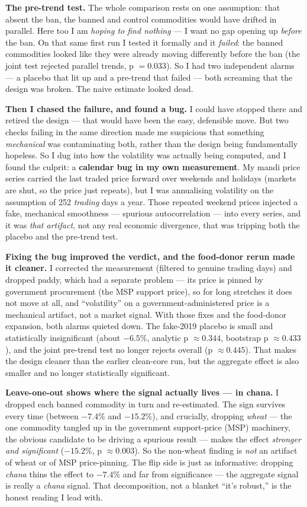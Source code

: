 \documentclass[11pt]{article}
\begin{document}
\textbf{The pre-trend test.} The whole comparison rests on one assumption: that absent the ban, the banned and control commodities would have drifted in parallel. Here too I am \emph{hoping to find nothing} --- I want no gap opening up \emph{before} the ban. On that same first run I tested it formally and it \emph{failed}: the banned commodities looked like they were already moving differently before the ban (the joint test rejected parallel trends, p $=0.033$). So I had two independent alarms --- a placebo that lit up and a pre-trend that failed --- both screaming that the design was broken. The naive estimate looked dead.

\textbf{Then I chased the failure, and found a bug.} I could have stopped there and retired the design --- that would have been the easy, defensible move. But two checks failing in the same direction made me suspicious that something \emph{mechanical} was contaminating both, rather than the design being fundamentally hopeless. So I dug into how the volatility was actually being computed, and I found the culprit: a \textbf{calendar bug in my own measurement}. My mandi price series carried the last traded price forward over weekends and holidays (markets are shut, so the price just repeats), but I was annualising volatility on the assumption of 252 \emph{trading} days a year. Those repeated weekend prices injected a fake, mechanical smoothness --- spurious autocorrelation --- into every series, and it was \emph{that artifact}, not any real economic divergence, that was tripping both the placebo and the pre-trend test.

\textbf{Fixing the bug improved the verdict, and the food-donor rerun made it cleaner.} I corrected the measurement (filtered to genuine trading days) and dropped paddy, which had a separate problem --- its price is pinned by government procurement (the MSP support price), so for long stretches it does not move at all, and ``volatility'' on a government-administered price is a mechanical artifact, not a market signal. With those fixes and the food-donor expansion, both alarms quieted down. The fake-2019 placebo is small and statistically insignificant (about $-6.5\%$, analytic p $\approx 0.344$, bootstrap p $\approx 0.433$), and the joint pre-trend test no longer rejects overall (p $\approx 0.445$). That makes the design cleaner than the earlier clean-core run, but the aggregate effect is also smaller and no longer statistically significant.

\textbf{Leave-one-out shows where the signal actually lives --- in chana.} I dropped each banned commodity in turn and re-estimated. The sign survives every time (between $-7.4\%$ and $-15.2\%$), and crucially, dropping \emph{wheat} --- the one commodity tangled up in the government support-price (MSP) machinery, the obvious candidate to be driving a spurious result --- makes the effect \emph{stronger and significant} ($-15.2\%$, p $\approx 0.003$). So the non-wheat finding is \emph{not} an artifact of wheat or of MSP price-pinning. The flip side is just as informative: dropping \emph{chana} thins the effect to $-7.4\%$ and far from significance --- the aggregate signal is really a \emph{chana} signal. That decomposition, not a blanket ``it's robust,'' is the honest reading I lead with.
\end{document}
